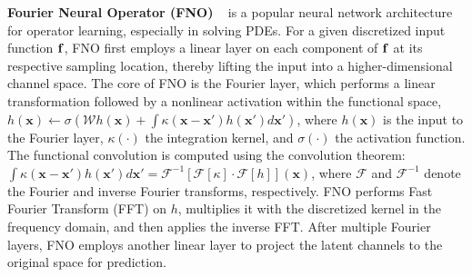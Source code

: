 \noindent\textbf{Fourier Neural Operator (FNO)}
~\citep{li2020fourier} is a popular  neural network architecture for operator learning, especially in solving PDEs. For a given discretized input function \({\bf f}\), FNO first employs a linear layer on each component of \({\bf f}\) at its respective sampling location, thereby lifting the input into a higher-dimensional channel space. The core of FNO is the Fourier layer, which performs a linear transformation followed by a nonlinear activation within the functional space,  
$ h(\mathbf{x}) \leftarrow \sigma \left( \mathcal{W}h(\mathbf{x}) + \int \kappa(\mathbf{x} - \mathbf{x}')h(\mathbf{x}')d\mathbf{x}' \right)$, where \(h(\mathbf{x})\) is the input to the Fourier layer, \(\kappa(\cdot)\) the integration kernel, and \(\sigma(\cdot)\) the activation function. The functional convolution is computed using the convolution theorem:
$ \int \kappa(\mathbf{x} - \mathbf{x}')h(\mathbf{x}')d\mathbf{x}' = \mathcal{F}^{-1} [\mathcal{F}[\kappa] \cdot \mathcal{F}[h]](\mathbf{x})$, 
where \(\mathcal{F}\) and \(\mathcal{F}^{-1}\) denote the Fourier and inverse Fourier transforms, respectively. %
FNO performs Fast Fourier Transform (FFT) on \(h\), multiplies it with the discretized kernel in the frequency domain, and then applies the inverse FFT. %
After multiple Fourier layers, FNO employs another linear layer to project the latent channels to the original space for prediction. 


